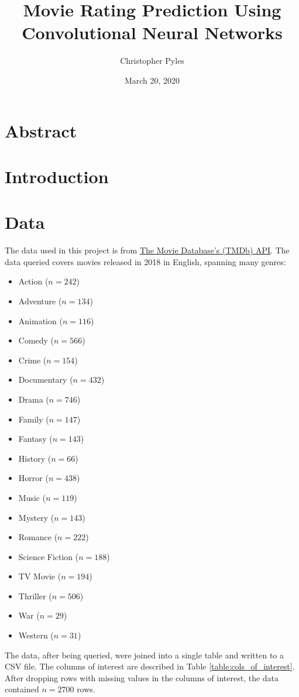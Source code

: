 \documentclass[12pt, oneside]{article}   	%
\title{%
	Movie Rating Prediction Using Convolutional Neural Networks}
\author{Christopher Pyles}
\date{March 20, 2020}							%
\begin{document}
\maketitle

\section*{Abstract}



\section{Introduction}



\section{Data}

The data used in this project is from \href{https://api.tmdb.org}{The Movie Database's (TMDb) API}. The data queried covers movies released in 2018 in English, spanning many genres: 

\begin{itemize}
\item Action ($n=242$)
\item Adventure ($n=134$)
\item Animation ($n=116$)
\item Comedy ($n=566$)
\item Crime ($n=154$)
\item Documentary ($n=432$)
\item Drama ($n=746$)
\item Family ($n=147$)
\item Fantasy ($n=143$)
\item History ($n=66$)
\item Horror ($n=438$)
\item Music ($n=119$)
\item Mystery ($n=143$)
\item Romance ($n=222$)
\item Science Fiction ($n=188$)
\item TV Movie ($n=194$)
\item Thriller ($n=506$)
\item War ($n=29$)
\item Western ($n=31$)
\end{itemize}

The data, after being queried, were joined into a single table and written to a CSV file. The columns of interest are described in Table \ref{table:cols_of_interest}. After dropping rows with missing values in the columns of interest, the data contained $n=2700$ rows.
\end{document}
